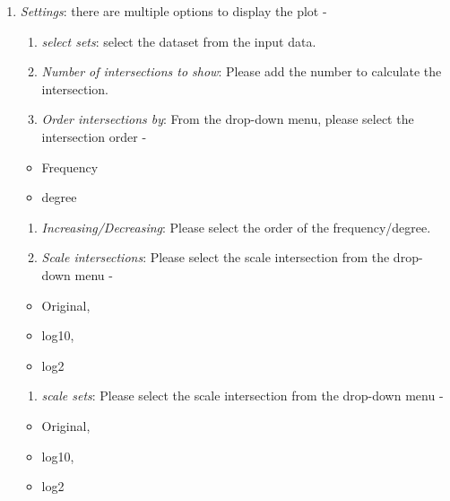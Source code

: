 \documentclass[
  a4paper,
  oneside,
  open=any]{scrreport}
\providecommand{\tightlist}{%
  \setlength{\itemsep}{0pt}\setlength{\parskip}{0pt}}\usepackage{longtable,booktabs,array}
\begin{document}
\begin{enumerate}
\def\labelenumi{\arabic{enumi}.}
\setcounter{enumi}{1}
\item
  \emph{Settings}: there are multiple options to display the plot -

  \begin{enumerate}
  \def\labelenumii{\roman{enumii}.}
  \item
    \emph{select sets}: select the dataset from the input data.
  \item
    \emph{Number of intersections to show}: Please add the number to
    calculate the intersection.
  \item
    \emph{Order intersections by}: From the drop-down menu, please
    select the intersection order -
  \end{enumerate}

  \begin{itemize}
  \tightlist
  \item
    Frequency
  \item
    degree
  \end{itemize}

  \begin{enumerate}
  \def\labelenumii{\roman{enumii}.}
  \setcounter{enumii}{3}
  \item
    \emph{Increasing/Decreasing}: Please select the order of the
    frequency/degree.
  \item
    \emph{Scale intersections}: Please select the scale intersection
    from the drop-down menu -
  \end{enumerate}

  \begin{itemize}
  \tightlist
  \item
    Original,
  \item
    log10,
  \item
    log2
  \end{itemize}

  \begin{enumerate}
  \def\labelenumii{\roman{enumii}.}
  \setcounter{enumii}{5}
  \tightlist
  \item
    \emph{scale sets}: Please select the scale intersection from the
    drop-down menu -
  \end{enumerate}

  \begin{itemize}
  \tightlist
  \item
    Original,
  \item
    log10,
  \item
    log2
  \end{itemize}


\end{enumerate}
\end{document}
